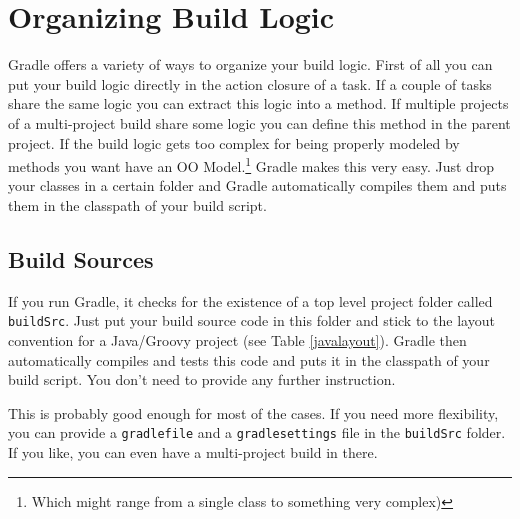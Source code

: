 \chapter{Organizing Build Logic} %
\label{cha:organizing_build_logic}
Gradle offers a variety of ways to organize your build logic. First of all you can put your build logic directly in the action closure of a task. If a couple of tasks share the same logic you can extract this logic into a method. If multiple projects of a multi-project build share some logic you can define this method in the parent project. If the build logic gets too complex for being properly modeled by methods you want have an OO Model.\footnote{Which might range from a single class to something very complex)} Gradle makes this very easy. Just drop your classes in a certain folder and Gradle automatically compiles them and puts them in the classpath of your build script.

\section{Build Sources} %
\label{sec:build_sources}
If you run Gradle, it checks for the existence of a top level project folder called \texttt{buildSrc}. Just put your build source code in this folder and stick to the layout convention for a Java/Groovy project (see Table \ref{javalayout}). Gradle then automatically compiles and tests this code and puts it in the classpath of your build script. You don't need to provide any further instruction. 

This is probably good enough for most of the cases. If you need more flexibility, you can provide a \texttt{gradlefile} and a \texttt{gradlesettings} file in the \texttt{buildSrc} folder. If you like, you can even have a multi-project build in there.


